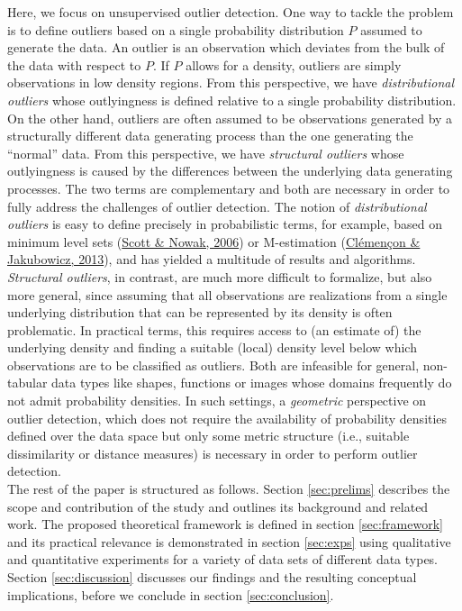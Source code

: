 \documentclass[
  10pt]{article}
\begin{document}
Here, we focus on unsupervised outlier detection. One way to tackle the problem is to define outliers based on a single probability distribution \(P\) assumed to generate the data. An outlier is an observation which deviates from the bulk of the data with respect to \(P\). If \(P\) allows for a density, outliers are simply observations in low density regions. From this perspective, we have \textit{distributional outliers} whose outlyingness is defined relative to a single probability distribution. On the other hand, outliers are often assumed to be observations generated by a structurally different data generating process than the one generating the ``normal'' data. From this perspective, we have \textit{structural outliers} whose outlyingness is caused by the differences between the underlying data generating processes.
The two terms are complementary and both are necessary in order to fully address the challenges of outlier detection. The notion of \emph{distributional outliers} is easy to define precisely in probabilistic terms, for example, based on minimum level sets (\protect\hyperlink{ref-scott2006learning}{Scott \& Nowak, 2006}) or M-estimation (\protect\hyperlink{ref-clemenccon2013scoring}{Clémençon \& Jakubowicz, 2013}), and has yielded a multitude of results and algorithms. \emph{Structural outliers}, in contrast, are much more difficult to formalize, but also more general, since assuming that all observations are realizations from a single underlying distribution that can be represented by its density is often problematic. In practical terms, this requires access to (an estimate of) the underlying density and finding a suitable (local) density level below which observations are to be classified as outliers.
Both are infeasible for general, non-tabular data types like shapes, functions or images whose domains frequently do not admit probability densities. In such settings,
a \emph{geometric} perspective on outlier detection, which does not require the availability of probability densities defined over the data space but only some metric structure (i.e., suitable dissimilarity or distance measures) is necessary in order to perform outlier detection.\\
\indent The rest of the paper is structured as follows. Section \ref{sec:prelims} describes the scope and contribution of the study and outlines its background and related work.
The proposed theoretical framework is defined in section \ref{sec:framework} and its practical relevance is demonstrated in section \ref{sec:exps} using qualitative and quantitative experiments for a variety of data sets of different data types. Section \ref{sec:discussion} discusses our findings and the resulting conceptual implications, before we conclude in section \ref{sec:conclusion}.
\end{document}

